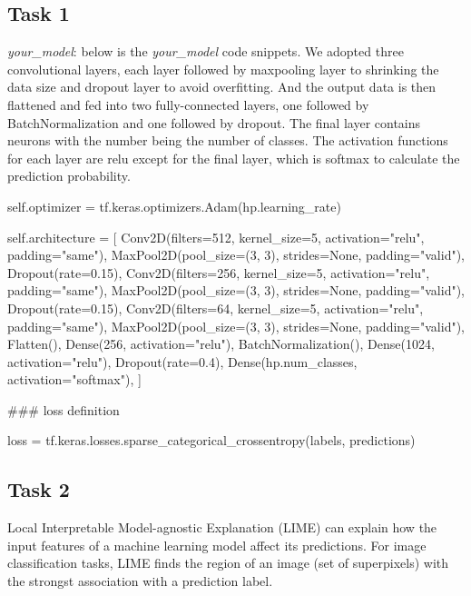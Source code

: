 \subsection*{Task 1}
\emph{your\_model}: below is the \textit{your\_model} code snippets. We adopted three convolutional layers, each layer followed by maxpooling layer to shrinking the data size and dropout layer to avoid overfitting. And the output data is then flattened and fed into two fully-connected layers, one followed by BatchNormalization and one followed by dropout. The final layer contains neurons with the number being the number of classes. The activation functions for each layer are relu except for the final layer, which is softmax to calculate the prediction probability.
          \begin{python}
self.optimizer = tf.keras.optimizers.Adam(hp.learning_rate)

self.architecture = [
    Conv2D(filters=512, kernel_size=5, activation="relu", padding="same"),
    MaxPool2D(pool_size=(3, 3), strides=None, padding="valid"),
    Dropout(rate=0.15),
    Conv2D(filters=256, kernel_size=5, activation="relu", padding="same"),
    MaxPool2D(pool_size=(3, 3), strides=None, padding="valid"),
    Dropout(rate=0.15),
    Conv2D(filters=64, kernel_size=5, activation="relu", padding="same"),
    MaxPool2D(pool_size=(3, 3), strides=None, padding="valid"),
    Flatten(),
    Dense(256, activation="relu"),
    BatchNormalization(),
    Dense(1024, activation="relu"),
    Dropout(rate=0.4),
    Dense(hp.num_classes, activation="softmax"),
]

### loss definition

loss = tf.keras.losses.sparse_categorical_crossentropy(labels, predictions)
          \end{python}

\subsection*{Task 2}
Local Interpretable Model-agnostic Explanation (LIME) can explain how the input features of a machine learning model affect its predictions. For image classification tasks, LIME finds the region of an image (set of superpixels) with the strongst association with a prediction label.

